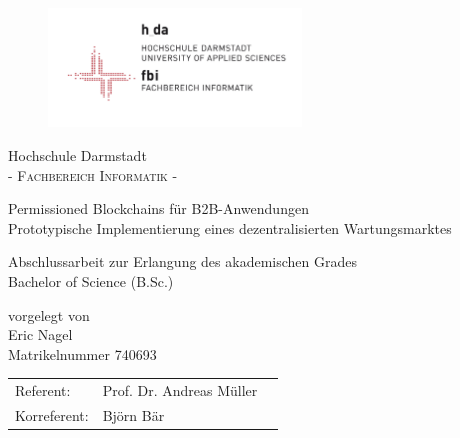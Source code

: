 \pagestyle{empty} %

\begin{figure}[t]
	\centering
	\includegraphics[width=0.6\textwidth]{images/logo_fbi}
\end{figure}


\begin{center}
\Large Hochschule Darmstadt \\
\normalsize \textsc{- Fachbereich Informatik -} \\

\vspace{80 pt}

\Huge Permissioned Blockchains für B2B-Anwendungen \\ 
\Large Prototypische Implementierung eines dezentralisierten Wartungsmarktes \\
\normalsize
\vspace{20 pt}

Abschlussarbeit zur Erlangung des akademischen Grades \\ 
Bachelor of Science (B.Sc.) 

\vspace{75 pt}


vorgelegt von \\
\vspace{5 pt}
Eric Nagel \\
Matrikelnummer 740693
\vspace{80 pt}

\begin{tabular}[h]{p{4cm}l l}
	Referent: & Prof. Dr. Andreas Müller \\
	Korreferent: & Björn Bär
\end{tabular}


\end{center}
